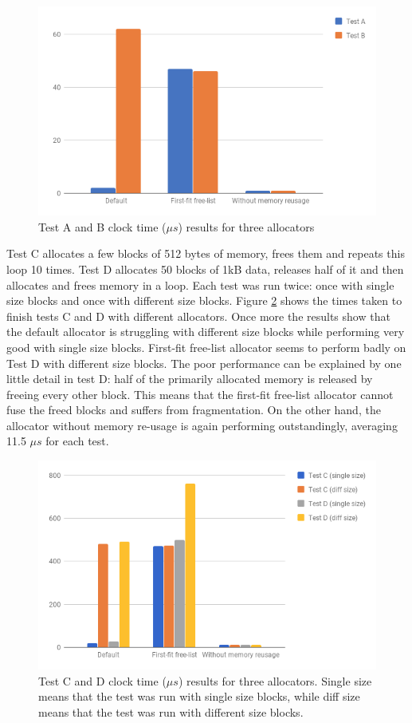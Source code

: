 \documentclass[bsc,frontabs,twoside,singlespacing,parskip,deptreport]{infthesis}     %
\begin{document}
\begin{figure}[H]
	\centering
	\includegraphics[width=12cm]{allocator_test_a}
	\caption{Test A and B clock time (\(\mu s\)) results for three allocators}
	\label{testa_b}
\end{figure}


Test C allocates a few blocks of 512 bytes of memory, frees them and repeats this loop 10 times. Test D allocates 50 blocks of 1kB data, releases half of it and then allocates and frees memory in a loop. Each test was run twice: once with single size blocks and once with different size blocks. Figure \ref{testc_d} shows the times taken to finish tests C and D with different allocators. Once more the results show that the default allocator is struggling with different size blocks while performing very good with single size blocks. First-fit free-list allocator seems to perform badly on Test D with different size blocks. The poor performance can be explained by one little detail in test D: half of the primarily allocated memory is released by freeing every other block. This means that the first-fit free-list allocator cannot fuse the freed blocks and suffers from fragmentation. On the other hand, the allocator without memory re-usage is again performing outstandingly, averaging 11.5 \(\mu s\) for each test.

\begin{figure}[H]
	\centering
	\includegraphics[width=12cm]{allocator_test_c}
	\caption{Test C and D clock time (\(\mu s\)) results for three allocators. Single size means that the test was run with single size blocks, while diff size means that the test was run with different size blocks.}
	\label{testc_d}
\end{figure}
\end{document}
